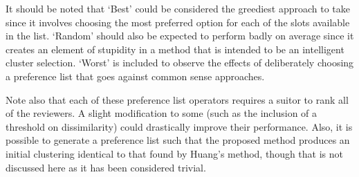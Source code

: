 \begin{remark}
    It should be noted that `Best' could be considered the greediest approach to
    take since it involves choosing the most preferred option for each of the
    slots available in the list. `Random' should also be expected to perform
    badly on average since it creates an element of stupidity in a method that
    is intended to be an intelligent cluster selection. `Worst' is included to
    observe the effects of deliberately choosing a preference list that goes
    against common sense approaches.

    Note also that each of these preference list operators requires a suitor to
    rank all of the reviewers. A slight modification to some (such as the
    inclusion of a threshold on dissimilarity) could drastically improve their
    performance. Also, it is possible to generate a preference list such that
    the proposed method produces an initial clustering identical to that found
    by Huang's method, though that is not discussed here as it has been
    considered trivial.
\end{remark}
